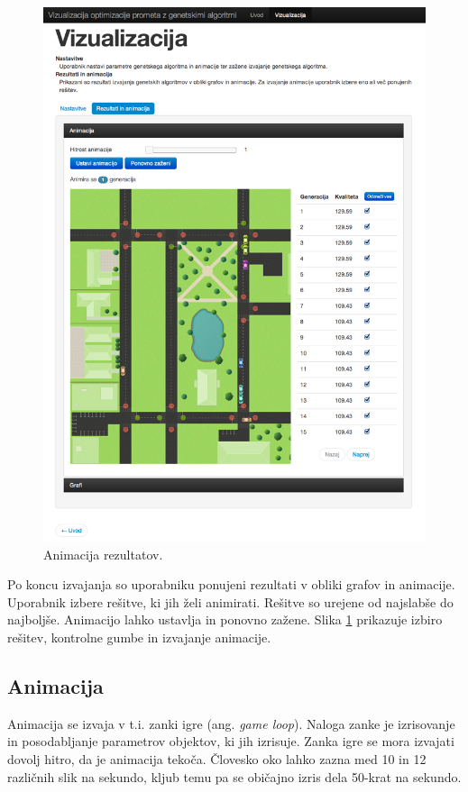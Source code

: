 \documentclass[a4paper, 12pt]{book}
\begin{document}
\begin{figure}
\centering
\includegraphics[scale=0.50]{rezultati.png}
\caption{Animacija rezultatov.}
\label{fig:vizualizacija-rezultati}
\end{figure}

Po koncu izvajanja so uporabniku ponujeni rezultati v obliki grafov in animacije. Uporabnik izbere re\v sitve, ki jih \v zeli animirati. Re\v sitve so urejene od najslab\v se do najbolj\v se. Animacijo lahko ustavlja in ponovno za\v zene. Slika \ref{fig:vizualizacija-rezultati} prikazuje izbiro re\v sitev, kontrolne gumbe in izvajanje animacije.


\subsection{Animacija}
Animacija se izvaja v t.i. zanki igre (ang. \textit{game loop}). Naloga zanke je izrisovanje in posodabljanje parametrov objektov, ki jih izrisuje. Zanka igre se mora izvajati dovolj hitro, da je animacija teko\v ca. \v Clovesko oko lahko zazna med 10 in 12 razli\v cnih slik na sekundo, kljub temu pa se obi\v cajno izris dela 50-krat na sekundo.
\end{document}

